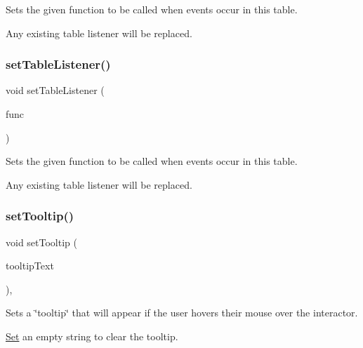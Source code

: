 Sets the given function to be called when events occur in this table. 

Any existing table listener will be replaced. \mbox{\label{classGTable_a0412cb4e079085ed5cb3bcdf2921ac84}} 
\subsubsection{\texorpdfstring{set\+Table\+Listener()}{setTableListener()}\hspace{0.1cm}{\footnotesize\ttfamily [2/2]}}
{\footnotesize\ttfamily void set\+Table\+Listener (\begin{DoxyParamCaption}\item[{G\+Event\+Listener\+Void}]{func }\end{DoxyParamCaption})\hspace{0.3cm}{\ttfamily [virtual]}}



Sets the given function to be called when events occur in this table. 

Any existing table listener will be replaced. \mbox{\label{classGInteractor_a039e0e49beaecc275efce02d416acea8}} 
\subsubsection{\texorpdfstring{set\+Tooltip()}{setTooltip()}}
{\footnotesize\ttfamily void set\+Tooltip (\begin{DoxyParamCaption}\item[{const std\+::string \&}]{tooltip\+Text }\end{DoxyParamCaption})\hspace{0.3cm}{\ttfamily [virtual]}, {\ttfamily [inherited]}}



Sets a \char`\"{}tooltip\char`\"{} that will appear if the user hovers their mouse over the interactor. 

\mbox{\hyperlink{classSet}{Set}} an empty string to clear the tooltip. \mbox{\label{classGInteractor_a18e44e30b31525a243960ca3928125aa}} 
